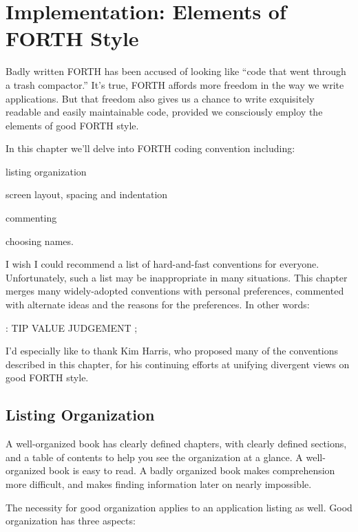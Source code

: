 
\chapter{
Implementation:
Elements of FORTH Style
}

Badly written FORTH has been accused of looking like ``code that went
through a trash compactor.'' It's true, FORTH affords more freedom in
the way we write applications.  But that freedom also gives us a chance to
write exquisitely readable and easily maintainable code, provided we consciously
employ the elements of good FORTH style.

In this chapter we'll delve into FORTH coding convention
including:
\begin{tfquot}
listing organization

screen layout, spacing and indentation

commenting

choosing names.
\end{tfquot}
I wish I could recommend a list of hard-and-fast conventions for
everyone.  Unfortunately, such a list may be inappropriate in many situations.
This chapter merges many widely-adopted conventions with personal
preferences, commented with alternate ideas and the reasons for
the preferences.  In other words:
\begin{Code}
: TIP VALUE JUDGEMENT ;
\end{Code}
I'd especially like to thank Kim Harris, who proposed many of the conventions
described in this chapter, for his continuing efforts at unifying
divergent views on good FORTH style.

\section{Listing Organization}

A well-organized book has clearly defined chapters, with clearly defined
sections, and a table of contents to help you see the organization at a
glance.  A well-organized book is easy to read.  A badly organized book
makes comprehension more difficult, and makes finding information
later on nearly impossible.

The necessity for good organization applies to an application listing
as well.  Good organization has three aspects:

